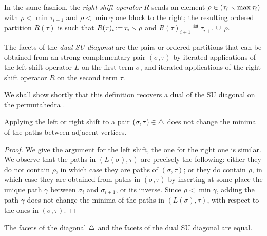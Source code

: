 In the same fashion, the \emph{right shift operator} $R$ sends an element $\rho \in (\tau_{i} \smallsetminus \max\tau_{i})$ with $\rho < \min \tau_{i+1}$ and $\rho < \min \gamma$ one block to the right; the resulting ordered partition $R(\tau)$ is such that $R(\tau)_i  \eqdef  \tau_i \ssm \rho$ and $R(\tau)_{i+1}  \eqdef  \tau_{i+1} \cup \ \rho$.

\begin{definition}
    The facets of the \emph{dual SU diagonal} are the pairs or ordered partitions that can be obtained from an strong complementary pair $(\sigma,\tau)$ by iterated applications of the left shift operator $L$ on the first term $\sigma$, and iterated applications of the right shift operator $R$ on the second term $\tau$. 
\end{definition}

We shall show shortly that this definition recovers a dual of the SU diagonal on the permutahedra \cite{SaneblidzeUmble04}.

\begin{lemma}
\label{l:minima-invariance}
    Applying the left or right shift to a pair $(\sigma,\tau) \in \triangle$ does not change the minima of the paths between adjacent vertices. 
\end{lemma}

\begin{proof}
We give the argument for the left shift, the one for the right one is similar. 
We observe that the paths in $(L(\sigma), \tau)$ are precisely the following: either they do not contain $\rho$, in which case they are paths of $(\sigma, \tau)$; or they do contain $\rho$, in which case they are obtained from paths in $(\sigma,\tau)$ by inserting at some place the unique path $\gamma$ between $\sigma_i$ and $\sigma_{i+1}$, or its inverse. 
Since $\rho < \min \gamma$, adding the path $\gamma$ does not change the minima of the paths in $(L(\sigma), \tau)$, with respect to the ones in $(\sigma, \tau)$.
\end{proof}

\begin{theorem}
\label{t:iso-with-SU}
    The facets of the diagonal $\triangle$ and the facets of the dual SU diagonal are equal. 
\end{theorem}

